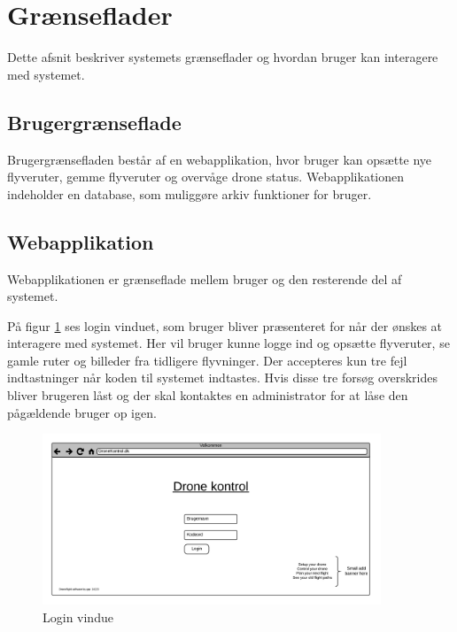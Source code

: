 \section{Grænseflader}
Dette afsnit beskriver systemets grænseflader og hvordan bruger kan interagere med systemet.

\subsection{Brugergrænseflade}
Brugergrænsefladen består af en webapplikation, hvor bruger kan opsætte nye flyveruter, gemme flyveruter og overvåge drone status. Webapplikationen indeholder en database, som muliggøre arkiv funktioner for bruger. 

\subsection{Webapplikation}
Webapplikationen er grænseflade mellem bruger og den resterende del af systemet. 

På figur \ref{fig:mockup_login} ses login vinduet, som bruger bliver præsenteret for når der ønskes at interagere med systemet. Her vil bruger kunne logge ind og opsætte flyveruter, se gamle ruter og billeder fra tidligere flyvninger. Der accepteres kun tre fejl indtastninger når koden til systemet indtastes. Hvis disse tre forsøg overskrides bliver brugeren låst og der skal kontaktes en administrator for at låse den pågældende bruger op igen.

\vspace{-5pt}
\begin{figure}[H]
	\centering
	\includegraphics[width=0.9\textwidth]{Billeder/UI_mockups/login.png}
	\vspace{-5pt}
	\caption{Login vindue}
	\label{fig:mockup_login}
\end{figure}

 \newpage

